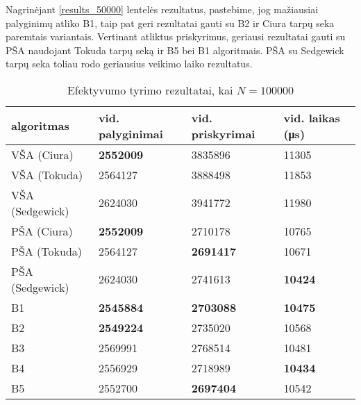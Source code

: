 \documentclass{VUMIFInfKursinis}
\begin{document}
Nagrinėjant \ref{results_50000} lentelės rezultatus, pastebime, jog
mažiausiai palyginimų atliko B1, taip pat geri rezultatai gauti su B2 ir Ciura tarpų seka paremtais variantais.
Vertinant atliktus priskyrimus, geriausi rezultatai gauti su PŠA naudojant Tokuda tarpų seką ir B5 bei B1 algoritmais.
PŠA su Sedgewick tarpų seka toliau rodo geriausius veikimo laiko rezultatus.

\begin{table}[H]
  \caption{Efektyvumo tyrimo rezultatai, kai $N = 100000$}
  \label{results_100000}
  \centering
  \begin{tabular}{llll}
    algoritmas & vid. palyginimai                         & vid. priskyrimai                         & vid. laikas (μs)                       \\ \midrule
    VŠA (Ciura)       & \cellcolor[HTML]{70AD47}\textbf{2552009} & 3835896                                  & 11305                                  \\
    VŠA (Tokuda)      & 2564127                                  & 3888498                                  & 11853                                  \\
    VŠA (Sedgewick)       & 2624030                                  & 3941772                                  & 11980                                  \\
    PŠA (Ciura)      & \cellcolor[HTML]{70AD47}\textbf{2552009} & 2710178                                  & 10765                                  \\
    PŠA (Tokuda)      & 2564127                                  & \cellcolor[HTML]{70AD47}\textbf{2691417} & 10671                                  \\
    PŠA (Sedgewick)      & 2624030                                  & 2741613                                  & \cellcolor[HTML]{70AD47}\textbf{10424} \\
    B1 & \cellcolor[HTML]{70AD47}\textbf{2545884} & \cellcolor[HTML]{70AD47}\textbf{2703088} & \cellcolor[HTML]{70AD47}\textbf{10475} \\
    B2      & \cellcolor[HTML]{70AD47}\textbf{2549224} & 2735020                                  & 10568                                  \\
    B3      & 2569991                                  & 2768514                                  & 10481                                  \\
    B4      & 2556929                                  & 2718989                                  & \cellcolor[HTML]{70AD47}\textbf{10434} \\
    B5      & 2552700                                  & \cellcolor[HTML]{70AD47}\textbf{2697404} & 10542                                  \\  \bottomrule 
  \end{tabular}
\end{table}
\end{document}
